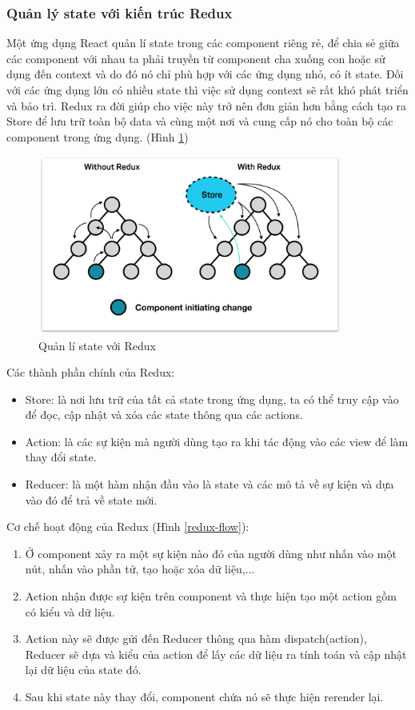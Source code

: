 \subsubsection{Quản lý state với kiến trúc Redux}

Một ứng dụng React quản lí state trong các component riêng rẻ, để chia sẻ giữa các component với nhau ta phải truyền từ component cha xuống con hoặc sử dụng đến context và do đó nó chỉ phù hợp với các ứng dụng nhỏ, có ít state. Đối với các ứng dụng lớn có nhiều state thì việc sử dụng context sẽ rất khó phát triển và bảo trì. Redux ra đời giúp cho việc này trở nên đơn giản hơn bằng cách tạo ra Store để lưu trữ toàn bộ data và cùng một nơi và cung cấp nó cho toàn bộ các component trong ứng dụng. (Hình \ref{redux})\par
\begin{figure}[h!]
    \begin{center}
        \includegraphics[width=10cm]{Image/Technical/redux.png}
        \caption{Quản lí state với Redux}
        \label{redux}
    \end{center}
\end{figure}
Các thành phần chính của Redux:
\begin{itemize}
    \item Store: là nơi lưu trữ của tất cả state trong ứng dụng, ta có thể truy cập vào để đọc, cập nhật và xóa các state thông qua các actions.
    \item Action: là các sự kiện mà người dùng tạo ra khi tác động vào các view để làm thay đổi state.
    \item Reducer: là một hàm nhận đầu vào là state và các mô tả về sự kiện và dựa vào đó để trả về state mới.
\end{itemize}

Cơ chế hoạt động của Redux (Hình \ref{redux-flow}):
\begin{enumerate}
    \item Ở component xảy ra một sự kiện nào đó của người dùng như nhấn vào một nút, nhấn vào phần tử, tạo hoặc xóa dữ liệu,...
    \item Action nhận được sự kiện trên component và thực hiện tạo một action gồm có kiểu và dữ liệu.
    \item Action này sẽ được gửi đến Reducer thông qua hàm dispatch(action), Reducer sẽ dựa và kiểu của action để lấy các dữ liệu ra tính toán và cập nhật lại dữ liệu của state đó.
    \item Sau khi state này thay đổi, component chứa nó sẽ thực hiện rerender lại.
\end{enumerate}

